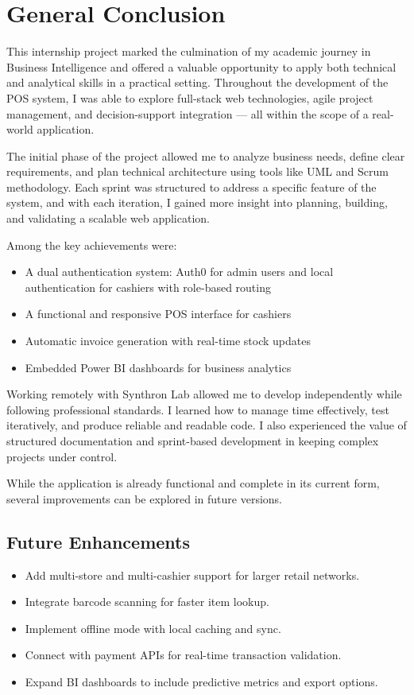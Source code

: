 \chapter*{General Conclusion}

This internship project marked the culmination of my academic journey in Business Intelligence and offered a valuable opportunity to apply both technical and analytical skills in a practical setting. Throughout the development of the POS system, I was able to explore full-stack web technologies, agile project management, and decision-support integration — all within the scope of a real-world application.

The initial phase of the project allowed me to analyze business needs, define clear requirements, and plan technical architecture using tools like UML and Scrum methodology. Each sprint was structured to address a specific feature of the system, and with each iteration, I gained more insight into planning, building, and validating a scalable web application.

Among the key achievements were:
\begin{itemize}
  \item A dual authentication system: Auth0 for admin users and local authentication for cashiers with role-based routing
  \item A functional and responsive POS interface for cashiers
  \item Automatic invoice generation with real-time stock updates
  \item Embedded Power BI dashboards for business analytics
\end{itemize}

Working remotely with Synthron Lab allowed me to develop independently while following professional standards. I learned how to manage time effectively, test iteratively, and produce reliable and readable code. I also experienced the value of structured documentation and sprint-based development in keeping complex projects under control.

While the application is already functional and complete in its current form, several improvements can be explored in future versions.

\section*{Future Enhancements}

\begin{itemize}
  \item Add multi-store and multi-cashier support for larger retail networks.
  \item Integrate barcode scanning for faster item lookup.
  \item Implement offline mode with local caching and sync.
  \item Connect with payment APIs for real-time transaction validation.
  \item Expand BI dashboards to include predictive metrics and export options.
\end{itemize}
